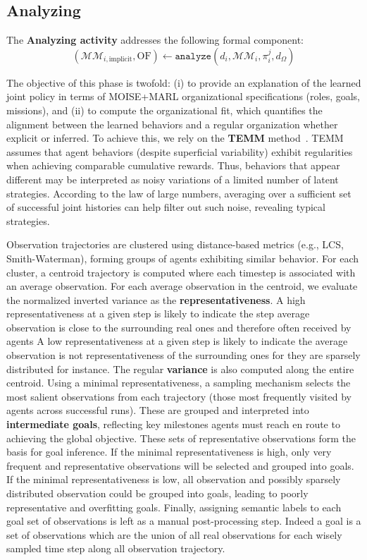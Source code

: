 \subsection{Analyzing}\label{sec:analyzing}

\noindent The \textbf{Analyzing activity} addresses the following formal component:
\[
    (\mathcal{MM}_{i,\text{implicit}}, \text{OF}) \gets \texttt{analyze}(d_i, \mathcal{MM}_i, \pi^j_i, d_\Omega)
\]

\noindent The objective of this phase is twofold: (i) to provide an explanation of the learned joint policy in terms of MOISE+MARL organizational specifications (roles, goals, missions), and (ii) to compute the organizational fit, which quantifies the alignment between the learned behaviors and a regular organization whether explicit or inferred.
%
To achieve this, we rely on the \textbf{TEMM} method~\cite{soule2025moisemarl}. TEMM assumes that agent behaviors (despite superficial variability) exhibit regularities when achieving comparable cumulative rewards. Thus, behaviors that appear different may be interpreted as noisy variations of a limited number of latent strategies. According to the law of large numbers, averaging over a sufficient set of successful joint histories can help filter out such noise, revealing typical strategies.

Observation trajectories are clustered using distance-based metrics (e.g., LCS, Smith-Waterman), forming groups of agents exhibiting similar behavior. For each cluster, a centroid trajectory is computed where each timestep is associated with an average observation. For each average observation in the centroid, we evaluate the normalized inverted variance as the \textbf{representativeness}. A high representativeness at a given step is likely to indicate the step average observation is close to the surrounding real ones and therefore often received by agents A low representativeness at a given step is likely to indicate the average observation is not representativeness of the surrounding ones for they are sparsely distributed for instance. The regular \textbf{variance} is also computed along the entire centroid.
%
Using a minimal representativeness, a sampling mechanism selects the most salient observations from each trajectory (those most frequently visited by agents across successful runs). These are grouped and interpreted into \textbf{intermediate goals}, reflecting key milestones agents must reach en route to achieving the global objective. These sets of representative observations form the basis for goal inference. If the minimal representativeness is high, only very frequent and representative observations will be selected and grouped into goals. If the minimal representativeness is low, all observation and possibly sparsely distributed observation could be grouped into goals, leading to poorly representative and overfitting goals. Finally, assigning semantic labels to each goal set of observations is left as a manual post-processing step. Indeed a goal is a set of observations which are the union of all real observations for each wisely sampled time step along all observation trajectory.

